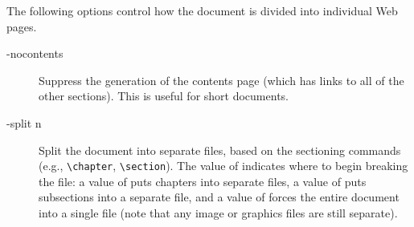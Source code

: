 The following options control how the document is divided into individual Web
pages.
\begin{description}
\item[-nocontents]Suppress the generation of the contents page (which has
links to all of the other sections).  This is useful for short documents.

\item[-split n]Split the document into separate files, based on the sectioning
commands (e.g., \verb+\chapter+, \verb+\section+).
The value of  indicates where to begin breaking the file: a value of
 puts chapters into separate files, a value of  puts
subsections into a separate file, and a value of  forces the entire
document into a single file (note that any image or graphics files are still
separate).
\end{description}


